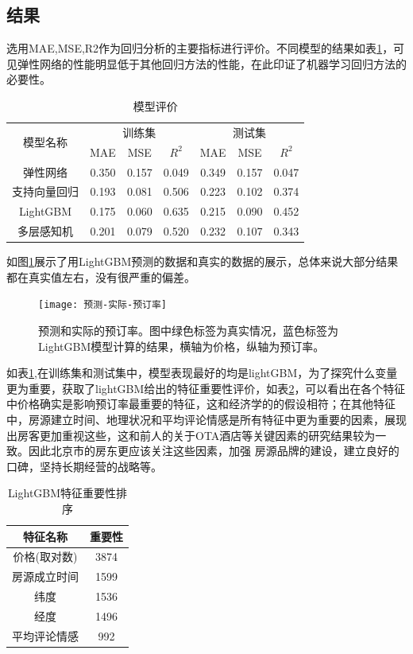 \documentclass{article}
\begin{document}
\begin{multicols}{2}
\section{结果}
选用MAE,MSE,R2作为回归分析的主要指标进行评价。不同模型的结果如表\ref{tab:模型评价}，可见弹性网络的性能明显低于其他回归方法的性能，在此印证了机器学习回归方法的必要性。
\begin{table}[H]
	\centering
	\begin{tabular}{|c|ccc|ccc|}
		\hline
		\multirow{2}{*}{模型名称} &  \multicolumn{3}{c|}{训练集}       &  \multicolumn{3}{c|}{测试集}  \\
		\cline{2-7}
			&      MAE  &  MSE     &    $R^2$   &   MAE     &   MSE    &  $R^2$\\ 
		\hline 
		弹性网络 & 0.350 & 0.157 & 0.049 & 0.349 & 0.157& 0.047 \\	  \hline 
		支持向量回归 & 0.193 & 0.081 & 0.506 & 0.223&0.102 & 0.374  \\	 \hline 
		LightGBM & 0.175 & 0.060 & 0.635 & 0.215 & 0.090 & 0.452 \\	 \hline 
		多层感知机 & 0.201 & 0.079 & 0.520 & 0.232 & 0.107 & 0.343\\	 \hline 
	\end{tabular}
\caption{模型评价}
\label{tab:模型评价}
\end{table}
\par 如图\ref{fig:预测-真实预订率}展示了用LightGBM预测的数据和真实的数据的展示，总体来说大部分结果都在真实值左右，没有很严重的偏差。
\begin{figure}[H]
	\centering
	\texttt{[image: 预测-实际-预订率]}
	\caption{预测和实际的预订率。图中绿色标签为真实情况，蓝色标签为LightGBM模型计算的结果，横轴为价格，纵轴为预订率。}
	\label{fig:预测-真实预订率}
\end{figure}
\par 如表\ref{tab:模型评价},在训练集和测试集中，模型表现最好的均是lightGBM，为了探究什么变量更为重要，获取了lightGBM给出的特征重要性评价，如表\ref{tab:特征重要性}，可以看出在各个特征中价格确实是影响预订率最重要的特征，这和经济学的的假设相符；在其他特征中，房源建立时间、地理状况和平均评论情感是所有特征中更为重要的因素，展现出房客更加重视这些，这和前人的关于OTA酒店等关键因素的研究结果较为一致。因此北京市的房东更应该关注这些因素，加强 房源品牌的建设，建立良好的口碑，坚持长期经营的战略等。
\begin{table}[!htpb]
	\centering
	\begin{tabular}{c|c}
		\hline 
		特征名称  & 重要性\\\hline
		价格(取对数) & 3874 \\
		房源成立时间 & 1599 \\
		纬度 & 1536 \\
		经度 & 1496\\
		平均评论情感 & 992 \\\hline 
	\end{tabular}
\caption{LightGBM特征重要性排序}
\label{tab:特征重要性}
\end{table}

\end{multicols}
\end{document}

